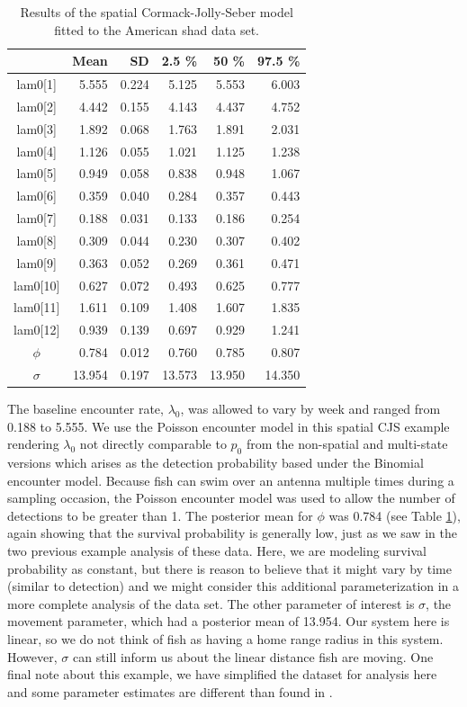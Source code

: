 \begin{table}
\centering
\caption{
Results of the spatial Cormack-Jolly-Seber model fitted to the 
American shad data set.
}
\begin{tabular}{crrrrr}
\hline \hline
&       Mean   &  SD  &  2.5 \%   &   50 \%    &  97.5 \% \\
\hline
lam0[1] &  5.555& 0.224  & 5.125 & 5.553 	& 6.003 \\
lam0[2] &  4.442& 0.155  & 4.143 & 4.437  & 4.752 \\
lam0[3] &  1.892& 0.068  & 1.763 & 1.891  & 2.031 \\
lam0[4] &  1.126& 0.055  & 1.021 & 1.125  & 1.238 \\
lam0[5] &  0.949& 0.058  & 0.838 & 0.948 & 1.067 \\
lam0[6] &  0.359& 0.040  & 0.284 & 0.357 & 0.443 \\
lam0[7] &  0.188& 0.031  & 0.133 & 0.186 &  0.254 \\
lam0[8] &  0.309 &0.044  & 0.230  & 0.307  & 0.402 \\
lam0[9]  & 0.363 &0.052 &  0.269 &  0.361 & 0.471 \\
lam0[10] & 0.627 &0.072  & 0.493  & 0.625  & 0.777 \\
lam0[11] & 1.611 &0.109  & 1.408  & 1.607  & 1.835 \\
lam0[12] & 0.939 &0.139 & 0.697  & 0.929  & 1.241 \\
$\phi$  &  0.784 &0.012  & 0.760  & 0.785  & 0.807 \\
$\sigma$ & 13.954& 0.197  & 13.573 & 13.950  & 14.350\\
\hline
\end{tabular}
\label{open.tab.shad1}
\end{table}

The baseline encounter rate, $\lambda_0$, was allowed to vary by week
and ranged from 0.188 to 5.555.  We use the Poisson encounter model in
this spatial CJS example rendering $\lambda_0$ not directly comparable
to $p_0$ from the non-spatial and multi-state versions which arises as
the detection probability based under the Binomial encounter model.
Because fish can swim over an antenna multiple times during a sampling
occasion, the Poisson encounter model was used to allow the number of
detections to be greater than 1.  The posterior mean for $\phi$ was
0.784 (see Table \ref{open.tab.shad1}), again showing that the
survival probability is generally low, just as we saw in the two
previous example analysis of these data.  Here, we are modeling
survival probability as constant, but there is reason to believe that
it might vary by time (similar to detection) and we might consider
this additional parameterization in a more complete analysis of the
data set. The other parameter of interest is $\sigma$, the movement
parameter, which had a posterior mean of 13.954.  Our system here is
linear, so we do not think of fish as having a home range radius in
this system.  However, $\sigma$ can still inform us about the linear
distance fish are moving.  One final note about this example, we have
simplified the dataset for analysis here and some parameter estimates
are different than found in \cite{raabe_diss:2012}.

